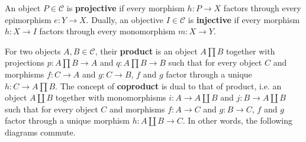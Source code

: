 \documentclass[openany, a4paper]{amsbook}
\theoremstyle{definition}
\numberwithin{equation}{chapter}
\begin{document}
An object $P \in \mathcal{C}$ is \textbf{projective} if every morphism $h: P \to X$ factors through every epimorphism $e: Y \to X$. Dually, an objective $I \in \mathcal{C}$ is \textbf{injective} if every morphism $h: X \to I$ factors through every monomorphism $m: X \to Y$.

\begin{figure}[!h]
    \tikzset{column sep=small, ampersand replacement=\&}
\begin{floatrow}
    \centering
    \end{floatrow}
\end{figure}

For two objects $A, B \in \mathcal{C}$, their \textbf{product} is an object $A \prod  B$ together with projections $p : A \prod  B \to A$ and $q : A \prod  B \to B$ such that for every object $C$ and morphisms $f : C \to A$ and $g : C \to B$, $f$ and $g$ factor through a unique $h: C \to A \prod  B$. The concept of \textbf{coproduct} is dual to that of product, i.e. an object $A \coprod B$ together with monomorphisms $i: A \to A \coprod B$ and $j : B \to A \coprod B$ such that for every object $C$ and morphisms $f : A \to C$ and $g : B \to C$, $f$ and $g$ factor through a unique morphism $h : A\coprod B \to C$. In other words, the following diagrams commute. 
\begin{figure}[h!]
    \tikzset{column sep=small, ampersand replacement=\&}
\begin{floatrow}
    \centering
    \end{floatrow}
\end{figure}
\end{document}
